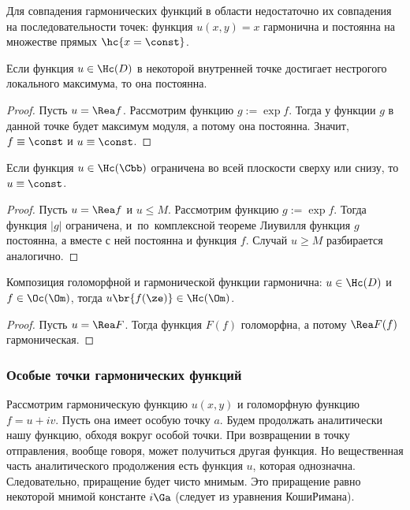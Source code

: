 \documentclass[a4paper]{article}
\begin{document}
\begin{note}
Для совпадения гармонических функций в области недостаточно их совпадения на последовательности точек:
функция $u(x,y) = x$ гармонична и постоянна на множестве прямых $\hc{x=\const}$.
\end{note}

\begin{theorem}
Если функция $u\in \Hc(D)$ в некоторой внутренней точке достигает нестрогого локального максимума, то она постоянна.
\end{theorem}
\begin{proof}
Пусть $u=\Rea f$. Рассмотрим функцию $g := \exp f$. Тогда у функции $g$ в данной точке будет максимум модуля,
а потому она постоянна. Значит, $f\equiv \const$ и $u \equiv \const$.
\end{proof}

\begin{theorem}[Лиувилля]
Если функция $u\in\Hc(\Cbb)$ ограничена во всей плоскости сверху или снизу, то $u\equiv\const$.
\end{theorem}
\begin{proof}
Пусть $u=\Rea f$ и $u \le M$. Рассмотрим функцию $g := \exp f$. Тогда функция $|g|$ ограничена,
и~по~комплексной теореме Лиувилля функция $g$ постоянна, а вместе с ней постоянна и функция $f$.
Случай $u \ge M$ разбирается аналогично.
\end{proof}

\begin{stm}
Композиция голоморфной и гармонической функции гармонична: $u\in \Hc(D)$ и $f \in \Oc(\Om)$, тогда
$u\br{f(\ze)} \in \Hc(\Om)$.
\end{stm}
\begin{proof}
Пусть $u = \Rea F$. Тогда функция $F(f)$ голоморфна, а потому $\Rea F(f)$ гармоническая.
\end{proof}

\subsubsection{Особые точки гармонических функций}

Рассмотрим гармоническую функцию $u(x,y)$ и голоморфную функцию $f = u+iv$. Пусть она имеет
особую точку $a$. Будем продолжать аналитически нашу функцию, обходя вокруг особой точки. При
возвращении в точку отправления, вообще говоря, может получиться другая функция. Но вещественная часть
аналитического продолжения есть функция $u$, которая однозначна. Следовательно, приращение будет чисто
мнимым. Это приращение равно некоторой мнимой константе $i\Ga$ (следует из уравнения Коши\ч Римана).
\end{document}
